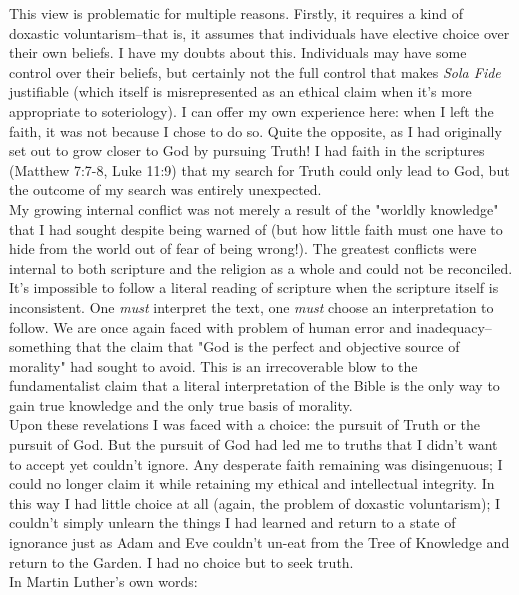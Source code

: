 \documentclass[a4paper, 11pt]{article}
\begin{document}
This view is problematic for multiple reasons. Firstly, it requires a kind of doxastic voluntarism--that is, it assumes that individuals have elective choice over their own beliefs. I have my doubts about this. Individuals may have some control over their beliefs, but certainly not the full control that makes \textit{Sola Fide} justifiable (which itself is misrepresented as an ethical claim when it's more appropriate to soteriology). I can offer my own experience here: when I left the faith, it was not because I chose to do so. Quite the opposite, as I had originally set out to grow closer to God by pursuing Truth! I had faith in the scriptures (Matthew 7:7-8, Luke 11:9) that my search for Truth could only lead to God, but the outcome of my search was entirely unexpected.  \\

My growing internal conflict was not merely a result of the "worldly knowledge" that I had sought despite being warned of (but how little faith must one have to hide from the world out of fear of being wrong!). The greatest conflicts were internal to both scripture and the religion as a whole and could not be reconciled. It's impossible to follow a literal reading of scripture when the scripture itself is inconsistent. One \textit{must} interpret the text, one \textit{must} choose an interpretation to follow. We are once again faced with problem of human error and inadequacy--something that the claim that "God is the perfect and objective source of morality" had sought to avoid. This is an irrecoverable blow to the fundamentalist claim that a literal interpretation of the Bible is the only way to gain true knowledge and the only true basis of morality. \\

Upon these revelations I was faced with a choice: the pursuit of Truth or the pursuit of God. But the pursuit of God had led me to truths that I didn't want to accept yet couldn't ignore. Any desperate faith remaining was disingenuous; I could no longer claim it while retaining my ethical and intellectual integrity. In this way I had little choice at all (again, the problem of doxastic voluntarism); I couldn't simply unlearn the things I had learned and return to a state of ignorance just as Adam and Eve couldn't un-eat from the Tree of Knowledge and return to the Garden. I had no choice but to seek truth. \\

In Martin Luther's own words: \\[-8pt]
\end{document}
